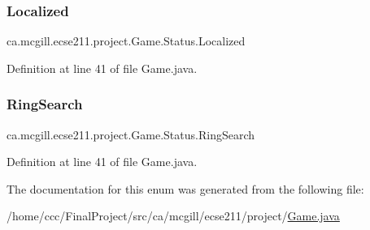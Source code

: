 \subsubsection{\texorpdfstring{Localized}{Localized}}
{\footnotesize\ttfamily ca.\+mcgill.\+ecse211.\+project.\+Game.\+Status.\+Localized}



Definition at line 41 of file Game.\+java.

\mbox{\label{enumca_1_1mcgill_1_1ecse211_1_1project_1_1_game_1_1_status_a6cb7397203bf9fa47c9486ede1e8fd6d}} 
\subsubsection{\texorpdfstring{Ring\+Search}{RingSearch}}
{\footnotesize\ttfamily ca.\+mcgill.\+ecse211.\+project.\+Game.\+Status.\+Ring\+Search}



Definition at line 41 of file Game.\+java.



The documentation for this enum was generated from the following file\+:\begin{DoxyCompactItemize}
\item 
/home/ccc/\+Final\+Project/src/ca/mcgill/ecse211/project/\hyperlink{_game_8java}{Game.\+java}\end{DoxyCompactItemize}

